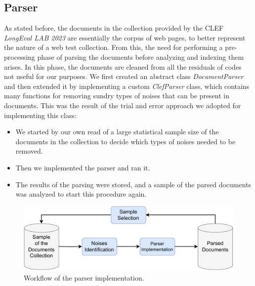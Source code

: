 \subsection{Parser} \label{parser_subsec}
As stated before, the documents in the collection provided by the \ac{CLEF} \textit{LongEval LAB 2023} \cite{cleflongeval} are essentially the corpus of web pages, to better represent the nature of a web test collection.
From this, the need for performing a pre-processing phase of parsing the documents before analyzing and indexing them arises.
In this phase, the documents are cleaned from all the residuals of codes not useful for our purposes. 
We first created an abstract class \textit{DocumentParser} and then extended it by implementing a custom \textit{ClefParser} class, which contains many functions for removing sundry types of noises that can be present in documents. 
This was the result of the trial and error approach we adopted for implementing this class:
\begin{itemize}
\item We started by our own read of a large statistical sample size of the documents in the collection to decide which types of noises needed to be removed.
\item Then we implemented the parser and ran it.
\item The results of the parsing were stored, and a sample of the parsed documents was analyzed to start this procedure again.
\end{itemize}

\begin{figure}[!h]
    \centering
    \includegraphics[width=0.8\linewidth]{figure/Parser_implementation_workflow.pdf}
    \caption{Workflow of the parser implementation.}
    \label{fig:Parser_implementation_workflow}
\end{figure}


